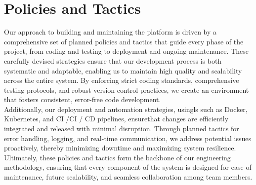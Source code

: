 \documentclass{FastFyp}
\begin{document}
\section{Policies and Tactics}
Our approach to building and maintaining the platform is driven by a comprehensive set of planned policies and tactics that guide every phase of the project, from coding and testing to deployment and ongoing maintenance. These carefully devised strategies ensure that our development process is both systematic and adaptable, enabling us to maintain high quality and scalability across the entire system. By enforcing strict coding standards, comprehensive testing protocols, and robust version control practices, we create an environment that fosters consistent, error-free code development.  \\
Additionally, our deployment and automation strategies, usingls such as Docker, Kubernetes, and CI /CI / CD pipelines, ensurethat changes are efficiently integrated and released with minimal disruption. Through planned tactics for error handling, logging, and real-time communication, we address potential issues proactively, thereby minimizing downtime and maximizing system resilience. Ultimately, these policies and tactics form the backbone of our engineering methodology, ensuring that every component of the system is designed for ease of maintenance, future scalability, and seamless collaboration among team members.
\end{document}
